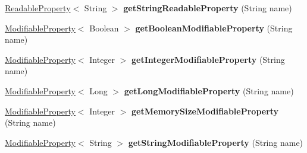 \begin{DoxyCompactItemize}
\item 
\mbox{\label{classcom_1_1mysql_1_1cj_1_1conf_1_1_default_property_set_a3eedd64227cd2e0ad94201c64992a259}} 
\mbox{\hyperlink{interfacecom_1_1mysql_1_1cj_1_1conf_1_1_readable_property}{Readable\+Property}}$<$ String $>$ {\bfseries get\+String\+Readable\+Property} (String name)
\item 
\mbox{\label{classcom_1_1mysql_1_1cj_1_1conf_1_1_default_property_set_a6b85f1ed4be93d0f58d5d8d0fa0e04b1}} 
\mbox{\hyperlink{interfacecom_1_1mysql_1_1cj_1_1conf_1_1_modifiable_property}{Modifiable\+Property}}$<$ Boolean $>$ {\bfseries get\+Boolean\+Modifiable\+Property} (String name)
\item 
\mbox{\label{classcom_1_1mysql_1_1cj_1_1conf_1_1_default_property_set_a24f6c3107ffad2e900facd8f89f91029}} 
\mbox{\hyperlink{interfacecom_1_1mysql_1_1cj_1_1conf_1_1_modifiable_property}{Modifiable\+Property}}$<$ Integer $>$ {\bfseries get\+Integer\+Modifiable\+Property} (String name)
\item 
\mbox{\label{classcom_1_1mysql_1_1cj_1_1conf_1_1_default_property_set_a5099422aad8cc1a99c4b0f037d661237}} 
\mbox{\hyperlink{interfacecom_1_1mysql_1_1cj_1_1conf_1_1_modifiable_property}{Modifiable\+Property}}$<$ Long $>$ {\bfseries get\+Long\+Modifiable\+Property} (String name)
\item 
\mbox{\label{classcom_1_1mysql_1_1cj_1_1conf_1_1_default_property_set_a6c2860544a6fc9ea0c1aab92e1db6ae6}} 
\mbox{\hyperlink{interfacecom_1_1mysql_1_1cj_1_1conf_1_1_modifiable_property}{Modifiable\+Property}}$<$ Integer $>$ {\bfseries get\+Memory\+Size\+Modifiable\+Property} (String name)
\item 
\mbox{\label{classcom_1_1mysql_1_1cj_1_1conf_1_1_default_property_set_a44d16d90d0307d426c319163a8a0811e}} 
\mbox{\hyperlink{interfacecom_1_1mysql_1_1cj_1_1conf_1_1_modifiable_property}{Modifiable\+Property}}$<$ String $>$ {\bfseries get\+String\+Modifiable\+Property} (String name)
\item 

\end{DoxyCompactItemize}
